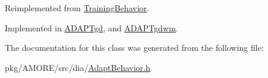 Reimplemented from \hyperlink{class_training_behavior_ae5729ae35b8557f92872ce778e4d8657}{TrainingBehavior}.



Implemented in \hyperlink{class_a_d_a_p_tgd_a61a992390f1994694918254eb49226a8}{ADAPTgd}, and \hyperlink{class_a_d_a_p_tgdwm_ae7aacd1009a935359982c0b78d87a990}{ADAPTgdwm}.



The documentation for this class was generated from the following file:\begin{DoxyCompactItemize}
\item 
pkg/AMORE/src/dia/\hyperlink{_adapt_behavior_8h}{AdaptBehavior.h}\end{DoxyCompactItemize}
